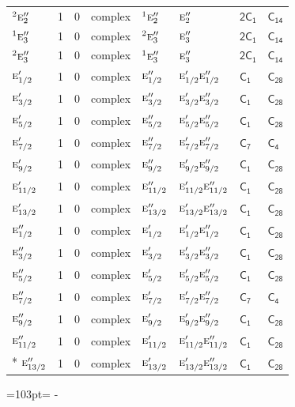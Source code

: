 \documentclass[10pt,a4paper]{article}
\makeatletter
\def\grouprule#1#2{\noalign{\marks\LTgroupmarks{\the\belowrulesep}\nobreak\vskip#1%
  \vskip\aboverulesep}\multispan\LT@cols\unskip{\leaders\hrule\@height#2\hfill\kern\z@}\cr
  \noalign{\penalty\LTrulebreak\vskip\belowrulesep\global\@lastruleclass\z@}}
\newcommand{\needspace}[1]{\par\penalty-100\begingroup\dimen0=#1\relax\dimen2=\pagegoal
  \advance\dimen2-\pagetotal\ifdim\dimen0>\dimen2\relax\ifdim\dimen2>0pt\vfil\break\fi\fi
  \endgroup}
\numberwithin{equation}{section}
\newcommand{\grp}[1]{\mathsf{#1}}
\newcommand{\irr}[1]{\text{\normalfont\scshape #1}}
\newcommand{\conjpair}[1]{{}^{#1}}
\makeatother
\begin{document}
{\begin{longtable}{@{}lrrlllll@{}}
$\conjpair{2}\irr{e}_{2}''$ & 1 & $0$ & complex & $\conjpair{1}\irr{e}_{2}''$ & $\irr{e}_{2}''$ & \href{2C1.pdf}{$\grp{2C_{1}}$} & $\grp{C_{14}}$\\
$\conjpair{1}\irr{e}_{3}''$ & 1 & $0$ & complex & $\conjpair{2}\irr{e}_{3}''$ & $\irr{e}_{3}''$ & \href{2C1.pdf}{$\grp{2C_{1}}$} & $\grp{C_{14}}$\\
$\conjpair{2}\irr{e}_{3}''$ & 1 & $0$ & complex & $\conjpair{1}\irr{e}_{3}''$ & $\irr{e}_{3}''$ & \href{2C1.pdf}{$\grp{2C_{1}}$} & $\grp{C_{14}}$\\
\grouprule{0pt}{\lightrulewidth}
$\irr{e}_{1/2}'$ & 1 & $0$ & complex & $\irr{e}_{1/2}''$ & $\irr{e}_{1/2}'\irr{e}_{1/2}''$ & \href{C1.pdf}{$\grp{C_{1}}$} & $\grp{C_{28}}$\\
$\irr{e}_{3/2}'$ & 1 & $0$ & complex & $\irr{e}_{3/2}''$ & $\irr{e}_{3/2}'\irr{e}_{3/2}''$ & \href{C1.pdf}{$\grp{C_{1}}$} & $\grp{C_{28}}$\\
$\irr{e}_{5/2}'$ & 1 & $0$ & complex & $\irr{e}_{5/2}''$ & $\irr{e}_{5/2}'\irr{e}_{5/2}''$ & \href{C1.pdf}{$\grp{C_{1}}$} & $\grp{C_{28}}$\\
$\irr{e}_{7/2}'$ & 1 & $0$ & complex & $\irr{e}_{7/2}''$ & $\irr{e}_{7/2}'\irr{e}_{7/2}''$ & \href{C7.pdf}{$\grp{C_{7}}$} & \href{../../../rotation/data/pdf/C4.pdf}{$\grp{C_{4}}$}\\
$\irr{e}_{9/2}'$ & 1 & $0$ & complex & $\irr{e}_{9/2}''$ & $\irr{e}_{9/2}'\irr{e}_{9/2}''$ & \href{C1.pdf}{$\grp{C_{1}}$} & $\grp{C_{28}}$\\
$\irr{e}_{11/2}'$ & 1 & $0$ & complex & $\irr{e}_{11/2}''$ & $\irr{e}_{11/2}'\irr{e}_{11/2}''$ & \href{C1.pdf}{$\grp{C_{1}}$} & $\grp{C_{28}}$\\
$\irr{e}_{13/2}'$ & 1 & $0$ & complex & $\irr{e}_{13/2}''$ & $\irr{e}_{13/2}'\irr{e}_{13/2}''$ & \href{C1.pdf}{$\grp{C_{1}}$} & $\grp{C_{28}}$\\
$\irr{e}_{1/2}''$ & 1 & $0$ & complex & $\irr{e}_{1/2}'$ & $\irr{e}_{1/2}'\irr{e}_{1/2}''$ & \href{C1.pdf}{$\grp{C_{1}}$} & $\grp{C_{28}}$\\
$\irr{e}_{3/2}''$ & 1 & $0$ & complex & $\irr{e}_{3/2}'$ & $\irr{e}_{3/2}'\irr{e}_{3/2}''$ & \href{C1.pdf}{$\grp{C_{1}}$} & $\grp{C_{28}}$\\
$\irr{e}_{5/2}''$ & 1 & $0$ & complex & $\irr{e}_{5/2}'$ & $\irr{e}_{5/2}'\irr{e}_{5/2}''$ & \href{C1.pdf}{$\grp{C_{1}}$} & $\grp{C_{28}}$\\
$\irr{e}_{7/2}''$ & 1 & $0$ & complex & $\irr{e}_{7/2}'$ & $\irr{e}_{7/2}'\irr{e}_{7/2}''$ & \href{C7.pdf}{$\grp{C_{7}}$} & \href{../../../rotation/data/pdf/C4.pdf}{$\grp{C_{4}}$}\\
$\irr{e}_{9/2}''$ & 1 & $0$ & complex & $\irr{e}_{9/2}'$ & $\irr{e}_{9/2}'\irr{e}_{9/2}''$ & \href{C1.pdf}{$\grp{C_{1}}$} & $\grp{C_{28}}$\\
$\irr{e}_{11/2}''$ & 1 & $0$ & complex & $\irr{e}_{11/2}'$ & $\irr{e}_{11/2}'\irr{e}_{11/2}''$ & \href{C1.pdf}{$\grp{C_{1}}$} & $\grp{C_{28}}$\\*
$\irr{e}_{13/2}''$ & 1 & $0$ & complex & $\irr{e}_{13/2}'$ & $\irr{e}_{13/2}'\irr{e}_{13/2}''$ & \href{C1.pdf}{$\grp{C_{1}}$} & $\grp{C_{28}}$\\
\bottomrule\end{longtable}}
\needspace{103pt}
\end{document}

